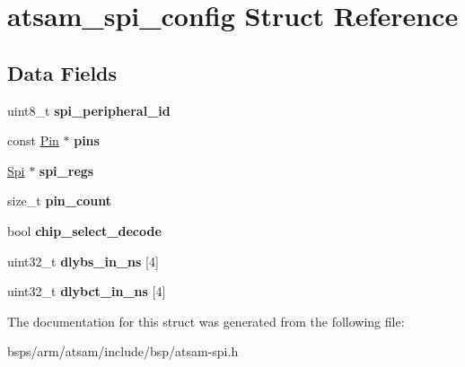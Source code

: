 \hypertarget{structatsam__spi__config}{}\section{atsam\+\_\+spi\+\_\+config Struct Reference}
\label{structatsam__spi__config}
\subsection*{Data Fields}
\begin{DoxyCompactItemize}
\item 
\mbox{\label{structatsam__spi__config_aef2b7da8f18e1b56a93d20d6567ccee2}} 
uint8\+\_\+t {\bfseries spi\+\_\+peripheral\+\_\+id}
\item 
\mbox{\label{structatsam__spi__config_a53b55be6549cfa7ca3592ca480d19ca9}} 
const \mbox{\hyperlink{struct__Pin}{Pin}} $\ast$ {\bfseries pins}
\item 
\mbox{\label{structatsam__spi__config_aeac2089475ea0f395816431bb0d7a7e5}} 
\mbox{\hyperlink{structSpi}{Spi}} $\ast$ {\bfseries spi\+\_\+regs}
\item 
\mbox{\label{structatsam__spi__config_afba3d24230dfa808c208096f0f39fd90}} 
size\+\_\+t {\bfseries pin\+\_\+count}
\item 
\mbox{\label{structatsam__spi__config_a3cfd6a37ee8a052d35df888f7d48adcb}} 
bool {\bfseries chip\+\_\+select\+\_\+decode}
\item 
\mbox{\label{structatsam__spi__config_aaae981b85fd13e31c546c4ee14be7f9a}} 
uint32\+\_\+t {\bfseries dlybs\+\_\+in\+\_\+ns} \mbox{[}4\mbox{]}
\item 
\mbox{\label{structatsam__spi__config_a6f8a133236b28a76b537e34761ba1d5b}} 
uint32\+\_\+t {\bfseries dlybct\+\_\+in\+\_\+ns} \mbox{[}4\mbox{]}
\end{DoxyCompactItemize}


The documentation for this struct was generated from the following file\+:\begin{DoxyCompactItemize}
\item 
bsps/arm/atsam/include/bsp/atsam-\/spi.\+h\end{DoxyCompactItemize}
